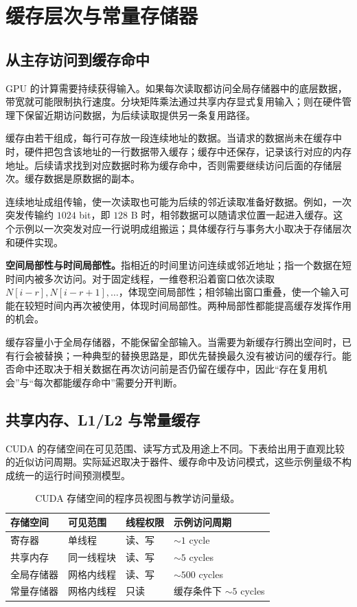 \section{缓存层次与常量存储器}
\label{l8:sec:memory}
\subsection{从主存访问到缓存命中}
GPU 的计算需要持续获得输入。如果每次读取都访问全局存储器中的底层数据，带宽就可能限制执行速度。分块矩阵乘法通过共享内存显式复用输入；则在硬件管理下保留近期访问数据，为后续读取提供另一条复用路径。

缓存由若干组成，每行可存放一段连续地址的数据。当请求的数据尚未在缓存中时，硬件把包含该地址的一行数据带入缓存；缓存中还保存，记录该行对应的内存地址。后续请求找到对应数据时称为缓存命中，否则需要继续访问后面的存储层次。缓存数据是原数据的副本。

连续地址成组传输，使一次读取也可能为后续的邻近读取准备好数据。例如，一次突发传输约 $1024$ bit，即 $128$ B 时，相邻数据可以随请求位置一起进入缓存。这个示例以一次突发对应一行说明成组搬运；具体缓存行与事务大小取决于存储层次和硬件实现。

\textbf{空间局部性与时间局部性。}指相近的时间里访问连续或邻近地址；指一个数据在短时间内被多次访问。对于固定线程，一维卷积沿着窗口依次读取 $N[i-r],N[i-r+1],\ldots$，体现空间局部性；相邻输出窗口重叠，使一个输入可能在较短时间内再次被使用，体现时间局部性。两种局部性都能提高缓存发挥作用的机会。

缓存容量小于全局存储器，不能保留全部输入。当需要为新缓存行腾出空间时，已有行会被替换；一种典型的替换思路是，即优先替换最久没有被访问的缓存行。能否命中还取决于相关数据在再次访问前是否仍留在缓存中，因此“存在复用机会”与“每次都能缓存命中”需要分开判断。

\subsection{共享内存、L1/L2 与常量缓存}
CUDA 的存储空间在可见范围、读写方式及用途上不同。下表给出用于直观比较的近似访问周期。实际延迟取决于器件、缓存命中及访问模式，这些示例量级不构成统一的运行时间预测模型。

\begin{table}[H]
\centering\small
\begin{tabularx}{\textwidth}{@{}p{}p{}p{}Y@{}}
\toprule
存储空间 & 可见范围 & 线程权限 & 示例访问周期 \\
\midrule
寄存器 & 单线程 & 读、写 & $\sim1$ cycle \\
共享内存 & 同一线程块 & 读、写 & $\sim5$ cycles \\
全局存储器 & 网格内线程 & 读、写 & $\sim500$ cycles \\
常量存储器 & 网格内线程 & 只读 & 缓存条件下 $\sim5$ cycles \\
\bottomrule
\end{tabularx}
\caption{CUDA 存储空间的程序员视图与教学访问量级。}
\end{table}

